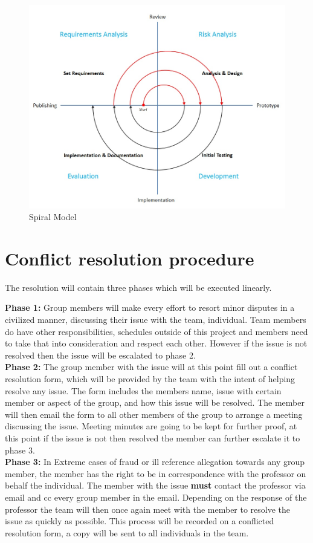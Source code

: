 \documentclass[oneside]{article}
\begin{document}
\begin{figure}[h]
\centering
\includegraphics[width=4.5in]{spiralFINALv2}
\caption{Spiral Model}
\end{figure}

\section{Conflict resolution procedure}

\noindent The resolution will contain three phases which will be executed linearly.

\noindent \textbf{Phase 1:} Group members will make every effort to resort minor disputes in a civilized manner, discussing their issue with the team, individual. Team members do have other responsibilities, schedules outside of this project and members need to take that into consideration and respect each other. However if the issue is not resolved then the issue will be escalated to phase 2.\\
\newline
\noindent \textbf{Phase 2:} The group member with the issue will at this point fill out a conflict resolution form, which will be provided by the team with the intent of helping resolve any issue. The form includes the members name, issue with certain member or aspect of the group, and how this issue will be resolved. The member will then email the form to all other members of the group to arrange a meeting discussing the issue. Meeting minutes are going to be kept for further proof, at this point if the issue is not then resolved the member can further escalate it to phase 3.\\
\newline
\noindent \textbf{Phase 3:} In Extreme cases of fraud or ill reference allegation towards any group member, the member has the right to be in correspondence with the professor on behalf the individual. The member with the issue \textbf{must} contact the professor via email and cc every group member in the email. Depending on the response of the professor the team will then once again meet with the member to resolve the issue as quickly as possible. This process will be recorded on a conflicted resolution form, a copy will be sent to all individuals in the team.
\end{document}
